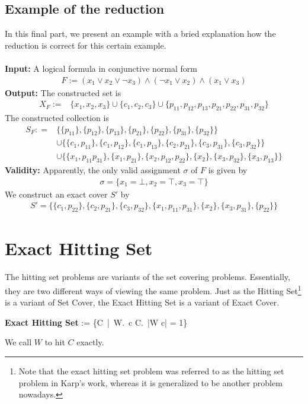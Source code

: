 \subsection{Example of the reduction}
In this final part, we present an example with a bried explanation how the reduction is correct for 
this certain example.\\\\
\textbf{Input:} A logical formula in conjunctive normal form 
\begin{align*}
    F := (x_1 \lor x_2 \lor \neg x_3) \land (\neg x_1 \lor x_2) \land (x_1 \lor x_3)
\end{align*}
\textbf{Output:}
The constructed set is
\begin{align*}
    X_F := & \{ x_1 ,x_2, x_3\} \cup \{c_1, c_2, c_3\} \cup 
    \{p_{11}, p_{12}, p_{13}, p_{21}, p_{22}, p_{31}, p_{32}\}
\end{align*}
The constructed collection is 
\begin{align*}
    S_F : = & \{\{p_{11}\}, \{p_{12}\}, \{p_{13}\}, \{p_{21}\}, \{p_{22}\}, \{p_{31}\}, \{p_{32}\}\} \\
      & \cup  \{\{c_1, p_{11}\}, \{c_1, p_{12}\}, \{c_1, p_{13}\}, \{c_2, p_{21}\}, 
      \{c_3, p_{31}\}, \{c_3, p_{32}\}\} \\ 
      & \cup \{\{x_1, p_{11} p_{31}\}, \{x_1, p_{21}\}, \{x_2, p_{12}, p_{22}\}, \{x_2\},
      \{x_3, p_{32}\}, \{x_3, p_{13}\}\}
\end{align*}
\textbf{Validity:} Apparently, the only valid assignment $\sigma$ of $F$ is given by 
\begin{align*}
    \sigma = \{x_1 = \bot, x_2 = \top, x_3 = \top \}
\end{align*}
We construct an exact cover $S'$ by 
\begin{align*}
    S' = \{\{c_1, p_{22}\}, \{c_2, p_{21}\}, \{c_3, p_{32}\},
    \{x_1, p_{11}, p_{31}\}, \{x_2\}, \{x_3, p_{31}\},
    \{p_{22}\}\}
\end{align*}

\section{Exact Hitting Set}
The hitting set problems are variants of the set covering problems. Essentially, they are two different ways 
of viewing the same problem. Just as the Hitting Set\footnote{Note that the exact hitting set problem was referred to as the hitting set problem in Karp's work, whereas 
it is generalized to be another problem nowadays.} is a variant of Set Cover, the Exact Hitting Set is 
a variant of Exact Cover. 
\begin{myalign}
   \textbf{Exact Hitting Set} := \{C\ |\ \exists W.\ \forall c \in C.\ |W \cap c| = 1\}
\end{myalign}
We call $W$ to hit $C$ exactly.
 

